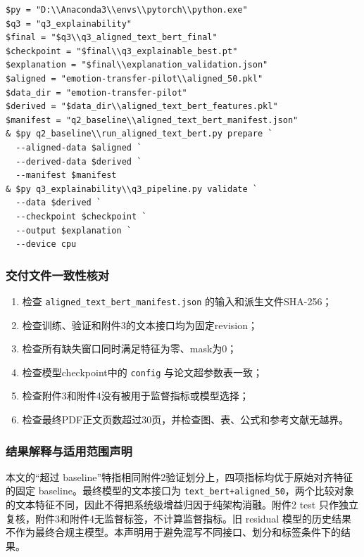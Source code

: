 \documentclass{gmcmthesis}
\newcommand{\code}[1]{\texttt{#1}}
\begin{document}
\begin{appendices}
\begin{verbatim}
$py = "D:\\Anaconda3\\envs\\pytorch\\python.exe"
$q3 = "q3_explainability"
$final = "$q3\\q3_aligned_text_bert_final"
$checkpoint = "$final\\q3_explainable_best.pt"
$explanation = "$final\\explanation_validation.json"
$aligned = "emotion-transfer-pilot\\aligned_50.pkl"
$data_dir = "emotion-transfer-pilot"
$derived = "$data_dir\\aligned_text_bert_features.pkl"
$manifest = "q2_baseline\\aligned_text_bert_manifest.json"
& $py q2_baseline\\run_aligned_text_bert.py prepare `
  --aligned-data $aligned `
  --derived-data $derived `
  --manifest $manifest
& $py q3_explainability\\q3_pipeline.py validate `
  --data $derived `
  --checkpoint $checkpoint `
  --output $explanation `
  --device cpu
\end{verbatim}
\subsubsection{交付文件一致性核对}
\begin{enumerate}[label=\arabic*.]
\item 检查 \code{aligned\_text\_bert\_manifest.json} 的输入和派生文件SHA-256；
\item 检查训练、验证和附件3的文本接口均为固定revision；
\item 检查所有缺失窗口同时满足特征为零、mask为0；
\item 检查模型checkpoint中的 \code{config} 与论文超参数表一致；
\item 检查附件3和附件4没有被用于监督指标或模型选择；
\item 检查最终PDF正文页数超过30页，并检查图、表、公式和参考文献无越界。
\end{enumerate}
\enlargethispage{3\baselineskip}
\subsubsection{结果解释与适用范围声明}
本文的“超过 baseline”特指相同附件2验证划分上，四项指标均优于原始对齐特征的固定 baseline。最终模型的文本接口为 \code{text\_bert+\allowbreak aligned\_50}，两个比较对象的文本特征不同，因此不得把系统级增益归因于纯架构消融。附件2 test 只作独立复核，附件3和附件4无监督标签，不计算监督指标。旧 residual 模型的历史结果不作为最终合规主模型。本声明用于避免混写不同接口、划分和标签条件下的结果。
\end{appendices}
\end{document}
